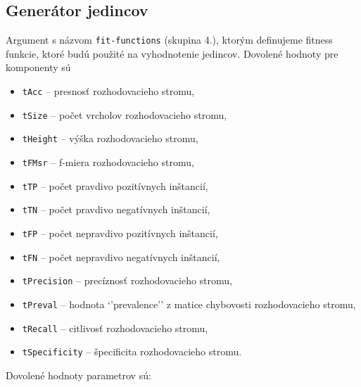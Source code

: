 \subsection*{Generátor jedincov}
Argument s názvom \verb|fit-functions| (skupina 4.), ktorým definujeme fitness funkcie, ktoré budú použité na vyhodnotenie jedincov.
Dovolené hodnoty pre komponenty sú 
\begin{itemize}
\item \verb|tAcc| -- presnosť rozhodovacieho stromu,
\item \verb|tSize|  -- počet vrcholov rozhodovacieho stromu,
\item \verb|tHeight| -- výška rozhodovacieho stromu,
\item \verb|tFMsr| -- f-miera rozhodovacieho stromu,
\item \verb|tTP| -- počet pravdivo pozitívnych inštancií,
\item \verb|tTN| -- počet pravdivo negatívnych inštancií,
\item \verb|tFP| -- počet nepravdivo pozitívnych inštancií,
\item \verb|tFN| -- počet nepravdivo negatívnych inštancií,
\item \verb|tPrecision| -- precíznosť rozhodovacieho stromu,
\item \verb|tPreval| -- hodnota `'prevalence'' z matice chybovosti rozhodovacieho stromu,
\item \verb|tRecall| -- citlivosť rozhodovacieho stromu,
\item \verb|tSpecificity| -- špecificita rozhodovacieho stromu.
\end{itemize}

Dovolené hodnoty parametrov sú: